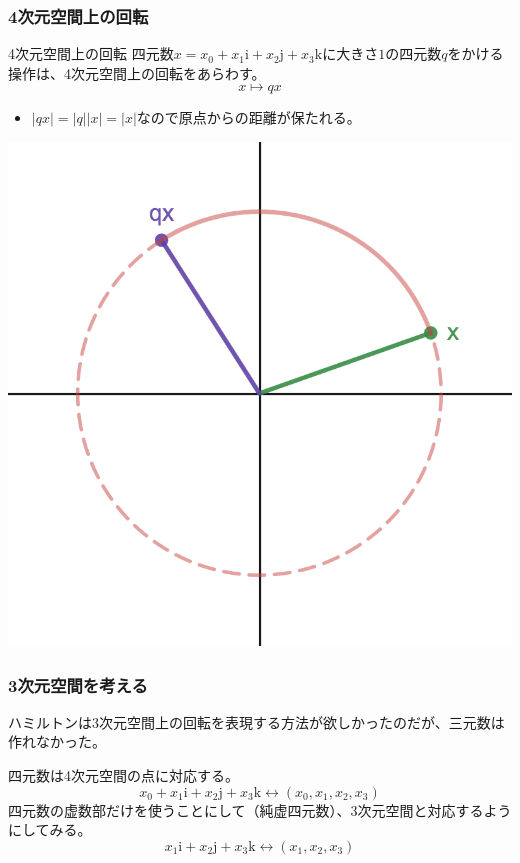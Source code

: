 \documentclass{beamer}
\newcommand{\ii}{\mathrm{i}}
\newcommand{\jj}{\mathrm{j}}
\newcommand{\kk}{\mathrm{k}}
\begin{document}
\begin{frame}
    \frametitle{4次元空間上の回転}
    \begin{block}{4次元空間上の回転}
        四元数\(x=x_0+x_1\ii+x_2\jj+x_3\kk\)に大きさ\(1\)の四元数\(q\)をかける操作は、4次元空間上の回転をあらわす。
        \[
            x\mapsto qx
        \]
    \end{block}
    \begin{itemize}
        \item \(|qx|=|q||x|=|x|\)なので原点からの距離が保たれる。
    \end{itemize}
    \begin{center}
        \includegraphics[scale=0.12]{RotateComplex.png}
    \end{center}
\end{frame}

\begin{frame}
    \frametitle{3次元空間を考える}
    ハミルトンは3次元空間上の回転を表現する方法が欲しかったのだが、三元数は作れなかった。

    \bigskip
    四元数は4次元空間の点に対応する。
    \[
        x_0+x_1\ii+x_2\jj+x_3\kk\leftrightarrow(x_0,x_1,x_2,x_3)
    \]
    四元数の虚数部だけを使うことにして（純虚四元数）、3次元空間と対応するようにしてみる。
    \[
        x_1\ii+x_2\jj+x_3\kk\leftrightarrow(x_1,x_2,x_3)
    \]
\end{frame}
\end{document}
